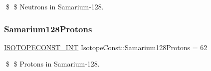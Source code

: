 \$ \$ Neutrons in Samarium-\/128. \mbox{\label{group___isotope_const-_samarium-_sm128_gade966e44b887153c043600ac82ba7df2}} 
\subsubsection{\texorpdfstring{Samarium128\+Protons}{Samarium128Protons}}
{\footnotesize\ttfamily \mbox{\hyperlink{group___isotope_const-_macros_ga5f18360b3e99483a35c32d789e62621c}{I\+S\+O\+T\+O\+P\+E\+C\+O\+N\+S\+T\+\_\+\+I\+NT}} Isotope\+Const\+::\+Samarium128\+Protons = 62}

\$ \$ Protons in Samarium-\/128. 